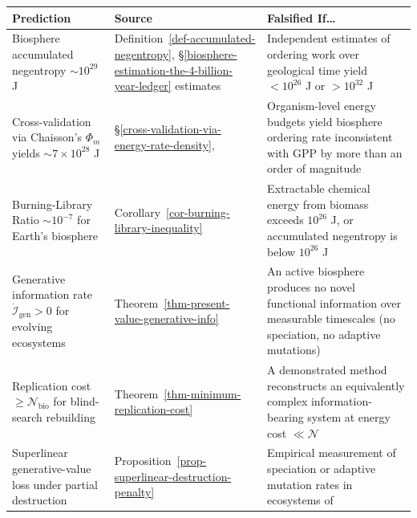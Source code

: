 \documentclass[11pt]{article}
\theoremstyle{plain}
\theoremstyle{definition}
\theoremstyle{remark}
\newcounter{none}
\begin{document}
{\def\LTcaptype{none} %
\begin{longtable}[]{@{}
  >{\raggedright\arraybackslash}p{}
  >{\raggedright\arraybackslash}p{}
  >{\raggedright\arraybackslash}p{}@{}}
\toprule\noalign{}
\begin{minipage}[b]{\linewidth}\raggedright
Prediction
\end{minipage} & \begin{minipage}[b]{\linewidth}\raggedright
Source
\end{minipage} & \begin{minipage}[b]{\linewidth}\raggedright
Falsified If\ldots{}
\end{minipage} \\
\midrule\noalign{}
\endhead
\bottomrule\noalign{}
\endlastfoot
Biosphere accumulated negentropy \(\sim 10^{29}\) J &
Definition~\ref{def-accumulated-negentropy},
§\ref{biosphere-estimation-the-4-billion-year-ledger} estimates &
Independent estimates of ordering work over geological time yield
\(< 10^{26}\) J or \(> 10^{32}\) J \\
Cross-validation via Chaisson's \(\Phi_m\) yields
\(\sim 7 \times 10^{28}\) J &
§\ref{cross-validation-via-energy-rate-density}, \citep{Chaisson2011} &
Organism-level energy budgets yield biosphere ordering rate inconsistent
with GPP by more than an order of magnitude \\
Burning-Library Ratio \(\sim 10^{-7}\) for Earth's biosphere &
Corollary~\ref{cor-burning-library-inequality} & Extractable chemical
energy from biomass exceeds \(10^{26}\) J, or accumulated negentropy is
below \(10^{26}\) J \\
Generative information rate \(\dot{\mathcal{I}}_{\text{gen}} > 0\) for
evolving ecosystems & Theorem~\ref{thm-present-value-generative-info} &
An active biosphere produces no novel functional information over
measurable timescales (no speciation, no adaptive mutations) \\
Replication cost \(\geq \mathcal{N}_{\text{bio}}\) for blind-search
rebuilding & Theorem~\ref{thm-minimum-replication-cost} & A demonstrated
method reconstructs an equivalently complex information-bearing system
at energy cost \(\ll \mathcal{N}\) \\
Superlinear generative-value loss under partial destruction &
Proposition~\ref{prop-superlinear-destruction-penalty} & Empirical
measurement of speciation or adaptive mutation rates in ecosystems of

\end{longtable}}
\end{document}
